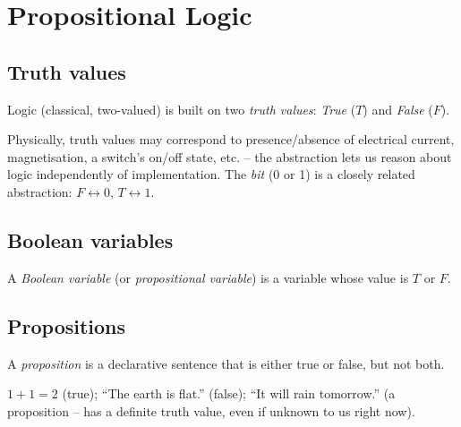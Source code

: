 \newpage
\section{Propositional Logic}

\subsection{Truth values}
\label{sec:4-1}

\begin{definition}
Logic (classical, two-valued) is built on two \emph{truth values}: \emph{True} ($T$) and \emph{False} ($F$).
\end{definition}

\begin{note}
Physically, truth values may correspond to presence/absence of electrical current, magnetisation, a switch's on/off state, etc. -- the abstraction lets us reason about logic independently of implementation. The \emph{bit} (0 or 1) is a closely related abstraction: $F \leftrightarrow 0$, $T \leftrightarrow 1$.
\end{note}

\subsection{Boolean variables}
\label{sec:4-2}

\begin{definition}
A \emph{Boolean variable} (or \emph{propositional variable}) is a variable whose value is $T$ or $F$.
\end{definition}

\subsection{Propositions}
\label{sec:4-3}

\begin{definition}[Proposition]
A \emph{proposition} is a declarative sentence that is either true or false, but not both.
\end{definition}

\begin{example}[Propositions]
$1+1=2$ (true); ``The earth is flat.'' (false); ``It will rain tomorrow.'' (a proposition -- has a definite truth value, even if unknown to us right now).
\end{example}

